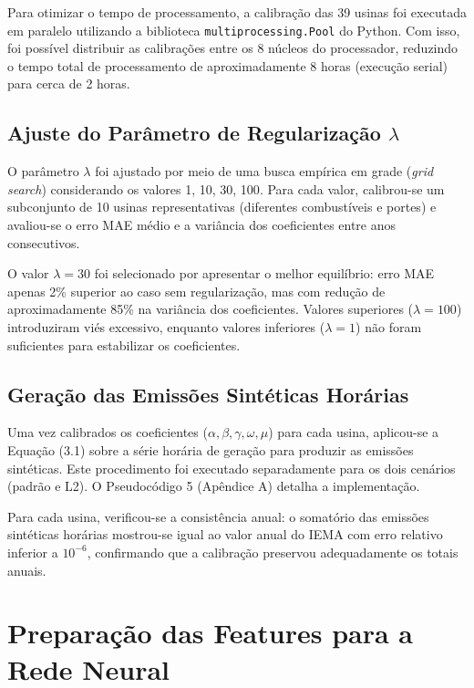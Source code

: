 Para otimizar o tempo de processamento, a calibração das 39 usinas foi executada em paralelo utilizando a biblioteca \texttt{multiprocessing.Pool} do Python. Com isso, foi possível distribuir as calibrações entre os 8 núcleos do processador, reduzindo o tempo total de processamento de aproximadamente 8 horas (execução serial) para cerca de 2 horas.

\subsection{Ajuste do Parâmetro de Regularização \(\lambda\)}

O parâmetro \(\lambda\) foi ajustado por meio de uma busca empírica em grade (\textit{grid search}) considerando os valores {1, 10, 30, 100}. Para cada valor, calibrou-se um subconjunto de 10 usinas representativas (diferentes combustíveis e portes) e avaliou-se o erro \ac{MAE} médio e a variância dos coeficientes entre anos consecutivos.

O valor \(\lambda = 30\) foi selecionado por apresentar o melhor equilíbrio: erro \ac{MAE} apenas 2\% superior ao caso sem regularização, mas com redução de aproximadamente 85\% na variância dos coeficientes. Valores superiores (\(\lambda = 100\)) introduziram viés excessivo, enquanto valores inferiores (\(\lambda = 1\)) não foram suficientes para estabilizar os coeficientes.

\subsection{Geração das Emissões Sintéticas Horárias}

Uma vez calibrados os coeficientes (\(\alpha, \beta, \gamma, \omega, \mu\)) para cada usina, aplicou-se a Equação (3.1) sobre a série horária de geração para produzir as emissões sintéticas. Este procedimento foi executado separadamente para os dois cenários (padrão e L2). O Pseudocódigo 5 (Apêndice A) detalha a implementação.

Para cada usina, verificou-se a consistência anual: o somatório das emissões sintéticas horárias mostrou-se igual ao valor anual do \ac{IEMA} com erro relativo inferior a \(10^{-6}\), confirmando que a calibração preservou adequadamente os totais anuais.

\section{Preparação das Features para a Rede Neural}

